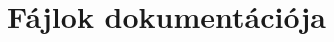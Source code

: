 \documentclass[twoside]{book}
\newcommand{\+}{\discretionary{\mbox{\scriptsize$\hookleftarrow$}}{}{}}
\newcommand{\clearemptydoublepage}{%
    \newpage{\pagestyle{empty}\cleardoublepage}%
  }
\begin{document}
\chapter{Fájlok dokumentációja}
















  \backmatter
  \newpage
  \clearemptydoublepage
  \printindex
\end{document}
